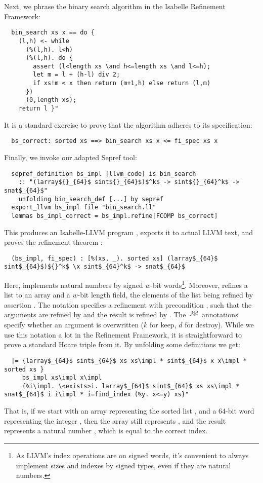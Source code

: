 \documentclass[a4paper,USenglish,cleveref, autoref]{lipics-v2019}
\begin{document}
Next, we phrase the binary search algorithm in the Isabelle Refinement Framework:
\begin{lstlisting}
  bin_search xs x == do {
    (l,h) <- while
      (%(l,h). l<h) 
      (%(l,h). do {
        assert (l<length xs \and h<=length xs \and l<=h);
        let m = l + (h-l) div 2;
        if xs!m < x then return (m+1,h) else return (l,m)
      }) 
      (0,length xs);
    return l }"
\end{lstlisting}
It is a standard exercise to prove that the algorithm adheres to its specification:
\begin{lstlisting}
  bs_correct: sorted xs ==> bin_search xs x <= fi_spec xs x
\end{lstlisting}
Finally, we invoke our adapted Sepref tool: 
\begin{lstlisting}
  sepref_definition bs_impl [llvm_code] is bin_search
    :: "(larray${}_{64}$ sint${}_{64}$)$^k$ -> sint${}_{64}^k$ -> snat$_{64}$"
    unfolding bin_search_def [...] by sepref
  export_llvm bs_impl file "bin_search.ll"
  lemmas bs_impl_correct = bs_impl.refine[FCOMP bs_correct]
\end{lstlisting}
This produces an Isabelle-LLVM program , exports it to actual LLVM text, and proves the refinement theorem :
\begin{lstlisting}
  (bs_impl, fi_spec) : [%(xs, _). sorted xs] (larray$_{64}$ sint$_{64}$)${}^k$ \x sint$_{64}^k$ -> snat$_{64}$
\end{lstlisting}
Here,  implements natural numbers by signed $w$-bit words\footnote{As LLVM's index operations are on signed words, 
  it's convenient to always implement sizes and indexes by signed types, even if they are natural numbers.}.
Moreover,  refines a list to an array and a $w$-bit length field, the elements of the list being refined by assertion .
The notation  specifies a refinement with precondition \q{\is{\Phi}}, such that the 
arguments are refined by  and the result is refined by . 
The $\cdot^{k|d}$ annotations specify whether an argument is overwritten ($k$ for keep, $d$ for destroy).
While we use this notation a lot in the Refinement Framework, it is straightforward to prove a standard Hoare triple from it. By unfolding some definitions we get:
\begin{lstlisting}
  |= {larray$_{64}$ sint$_{64}$ xs xs\impl * sint$_{64}$ x x\impl * sorted xs }
     bs_impl xs\impl x\impl
     {%i\impl. \<exists>i. larray$_{64}$ sint$_{64}$ xs xs\impl * snat$_{64}$ i i\impl * i=find_index (%y. x<=y) xs}"
\end{lstlisting}
That is, if we start with an array  representing the sorted list , and 
a 64-bit word  representing the integer ,
then the array still represents , and the result  represents a natural number , which is equal to the correct index.
\end{document}
